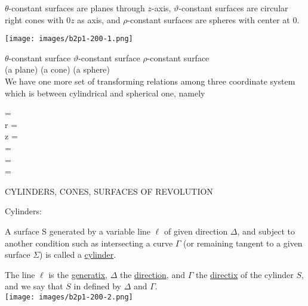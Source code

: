 \documentclass[11pt]{amsbook}
\begin{document}

$\theta$-constant surfaces are planes through $z$-axis, $\vartheta$-constant surfaces are circular right cones with $0z$ as axis, and $\rho$-constant surfaces are spheres with center at $0$. 

\texttt{[image: images/b2p1-200-1.png]}


$\theta$-constant surface\quad\quad\quad\quad    
$\vartheta$-constant surface\quad\quad\quad\quad
$\rho$-constant surface\\

\quad\quad(a plane)       \quad\quad\quad\quad\quad\quad\quad\quad
(a cone)        \quad\quad\quad\quad\quad\quad\quad\quad
(a sphere)\\

We have one more set of transforming relations among three coordinate system which is between cylindrical and spherical one, namely
\begin{center}
\begin{multicols}{2}
\theta = \theta\\
r = \rho\sin\vartheta\\
z = \rho\cos\vartheta\\
\theta = \theta\\
\vartheta = \arctan{}\\
\rho = \\

\end{multicols}
\end{center}

\begin{hEnumareteAlpha}
\item CYLINDERS, CONES, SURFACES OF REVOLUTION
\end{hEnumareteAlpha}
\begin{hEnumareteArabic}
\item Cylinders:
\end{hEnumareteArabic}
A surface S generated by a variable line $\ell$ of given direction $\Delta$, and subject to another condition such as intersecting a curve $\Gamma$ (or remaining tangent to a given surface $\Sigma$) is called a \underline{cylinder}.\\

\begin{multicols}{2}
The line $\ell$ is the \underline{generatix}, $\Delta$ the \underline{direction}, and $\Gamma$ the \underline{directix} of the cylinder $S$, and we say that $S$ in defined by $\Delta$ and $\Gamma$.\\
\texttt{[image: images/b2p1-200-2.png]}\\
\end{multicols}
\end{document}
